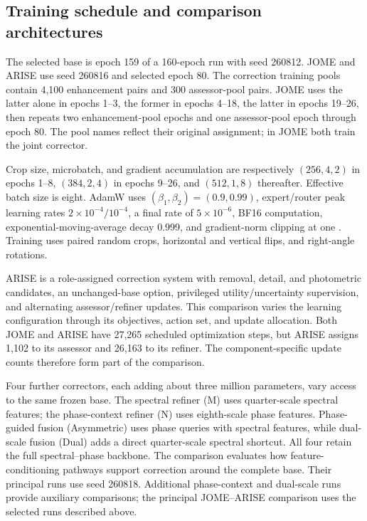 \documentclass[12pt]{article}
\begin{document}
\subsection{Training schedule and comparison architectures}
The selected base is epoch 159 of a 160-epoch run with seed 260812. JOME and ARISE use seed 260816 and selected epoch 80. The correction training pools contain 4,100 enhancement pairs and 300 assessor-pool pairs. JOME uses the latter alone in epochs 1--3, the former in epochs 4--18, the latter in epochs 19--26, then repeats two enhancement-pool epochs and one assessor-pool epoch through epoch 80. The pool names reflect their original assignment; in JOME both train the joint corrector.

Crop size, microbatch, and gradient accumulation are respectively $(256,4,2)$ in epochs 1--8, $(384,2,4)$ in epochs 9--26, and $(512,1,8)$ thereafter. Effective batch size is eight. AdamW uses $(\beta_1,\beta_2)=(0.9,0.99)$, expert/router peak learning rates $2\times10^{-4}/10^{-4}$, a final rate of $5\times10^{-6}$, BF16 computation, exponential-moving-average decay 0.999, and gradient-norm clipping at one \citep{loshchilov2019adamw}. Training uses paired random crops, horizontal and vertical flips, and right-angle rotations.

ARISE is a role-assigned correction system with removal, detail, and photometric candidates, an unchanged-base option, privileged utility/uncertainty supervision, and alternating assessor/refiner updates. This comparison varies the learning configuration through its objectives, action set, and update allocation. Both JOME and ARISE have 27,265 scheduled optimization steps, but ARISE assigns 1,102 to its assessor and 26,163 to its refiner. The component-specific update counts therefore form part of the comparison.

Four further correctors, each adding about three million parameters, vary access to the same frozen base. The spectral refiner (M) uses quarter-scale spectral features; the phase-context refiner (N) uses eighth-scale phase features. Phase-guided fusion (Asymmetric) uses phase queries with spectral features, while dual-scale fusion (Dual) adds a direct quarter-scale spectral shortcut. All four retain the full spectral--phase backbone. The comparison evaluates how feature-conditioning pathways support correction around the complete base. Their principal runs use seed 260818. Additional phase-context and dual-scale runs provide auxiliary comparisons; the principal JOME--ARISE comparison uses the selected runs described above.
\end{document}
